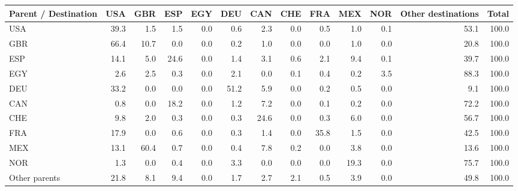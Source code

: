 \begin{tabular}{lrrrrrrrrrrrr}
\toprule
Parent / Destination & USA & GBR & ESP & EGY & DEU & CAN & CHE & FRA & MEX & NOR & Other destinations & Total \\
\midrule
USA & 39.3 & 1.5 & 1.5 & 0.0 & 0.6 & 2.3 & 0.0 & 0.5 & 1.0 & 0.1 & 53.1 & 100.0 \\
GBR & 66.4 & 10.7 & 0.0 & 0.0 & 0.2 & 1.0 & 0.0 & 0.0 & 1.0 & 0.0 & 20.8 & 100.0 \\
ESP & 14.1 & 5.0 & 24.6 & 0.0 & 1.4 & 3.1 & 0.6 & 2.1 & 9.4 & 0.1 & 39.7 & 100.0 \\
EGY & 2.6 & 2.5 & 0.3 & 0.0 & 2.1 & 0.0 & 0.1 & 0.4 & 0.2 & 3.5 & 88.3 & 100.0 \\
DEU & 33.2 & 0.0 & 0.0 & 0.0 & 51.2 & 5.9 & 0.0 & 0.2 & 0.5 & 0.0 & 9.1 & 100.0 \\
CAN & 0.8 & 0.0 & 18.2 & 0.0 & 1.2 & 7.2 & 0.0 & 0.1 & 0.2 & 0.0 & 72.2 & 100.0 \\
CHE & 9.8 & 2.0 & 0.3 & 0.0 & 0.3 & 24.6 & 0.0 & 0.3 & 6.0 & 0.0 & 56.7 & 100.0 \\
FRA & 17.9 & 0.0 & 0.6 & 0.0 & 0.3 & 1.4 & 0.0 & 35.8 & 1.5 & 0.0 & 42.5 & 100.0 \\
MEX & 13.1 & 60.4 & 0.7 & 0.0 & 0.4 & 7.8 & 0.2 & 0.0 & 3.8 & 0.0 & 13.6 & 100.0 \\
NOR & 1.3 & 0.0 & 0.4 & 0.0 & 3.3 & 0.0 & 0.0 & 0.0 & 19.3 & 0.0 & 75.7 & 100.0 \\
Other parents & 21.8 & 8.1 & 9.4 & 0.0 & 1.7 & 2.7 & 2.1 & 0.5 & 3.9 & 0.0 & 49.8 & 100.0 \\
\bottomrule
\end{tabular}
